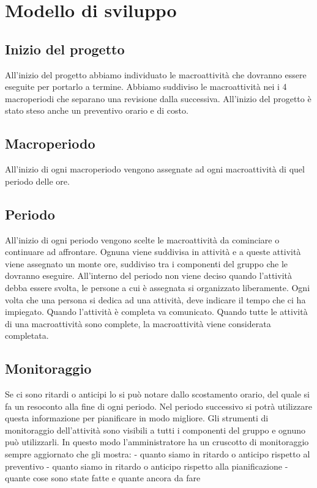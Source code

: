 \section{Modello di sviluppo}


\subsection{Inizio del progetto}
All'inizio del progetto abbiamo individuato le macroattività che dovranno essere eseguite per portarlo a termine.
Abbiamo suddiviso le macroattività nei i 4 macroperiodi che separano una revisione dalla successiva.
All'inizio del progetto è stato steso anche un preventivo orario e di costo.
\subsection{Macroperiodo}
All'inizio di ogni macroperiodo vengono assegnate ad ogni macroattività di quel periodo delle ore.
\subsection{Periodo}
All'inizio di ogni periodo vengono scelte le macroattività da cominciare o continuare ad affrontare.
Ognuna viene suddivisa in attività e a queste attività viene assegnato un monte ore, suddiviso tra i componenti del gruppo che le dovranno eseguire.
All'interno del periodo non viene deciso quando l'attività debba essere svolta, le persone a cui è assegnata si organizzato liberamente.
Ogni volta che una persona si dedica ad una attività, deve indicare il tempo che ci ha impiegato.
Quando l'attività è completa va comunicato.
Quando tutte le attività di una macroattività sono complete, la macroattività viene considerata completata.

\subsection{Monitoraggio}
Se ci sono ritardi o anticipi lo si può notare dallo scostamento orario, del quale si fa un resoconto alla fine di ogni periodo. Nel periodo successivo si potrà utilizzare questa informazione per pianificare in modo migliore.
Gli strumenti di monitoraggio dell'attività sono visibili a tutti i componenti del gruppo e ognuno può utilizzarli. In questo modo l'amministratore ha un cruscotto di monitoraggio sempre aggiornato che gli mostra:
- quanto siamo in ritardo o anticipo rispetto al preventivo
- quanto siamo in ritardo o anticipo rispetto alla pianificazione
- quante cose sono state fatte e quante ancora da fare

